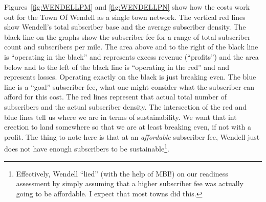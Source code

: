 \documentclass[12pt]{article}
\begin{document}
\clearpage

Figures~\ref{fig:WENDELLPM} and \ref{fig:WENDELLPN} show how the costs work
out for the Town Of Wendell as a single town network. The vertical red lines
show Wendell's total subscriber base and the average subscriber density. The
black line on the graphs show the subscriber fee for a range of total
subscriber count and subscribers per mile. The area above and to the right of
the black line is ``operating in the black'' and represents excess revenue
(``profits'') and the area below and to the left of the black line is
``operating in the red'' and and represents losses. Operating exactly on the
black is just breaking even. The blue line is a ``goal'' subscriber fee, what
one might consider what the subscriber can afford for this cost. The red lines
represent that actual total number of subscribers and the actual subscriber
density. The intersection of the red and blue lines tell us where we are in
terms of sustainability. We want that int erection to land somewhere so that we
are at least breaking even, if not with a profit. The thing to note here is
that at an \textit{affordable} subscriber fee, Wendell just does not have
enough subscribers to be sustainable\footnote{Effectively, Wendell ``lied''
(with the help of MBI!) on our readiness assessment by simply assuming that a
higher subscriber fee was actually going to be affordable. I expect that most
towns did this.}.
\end{document}
